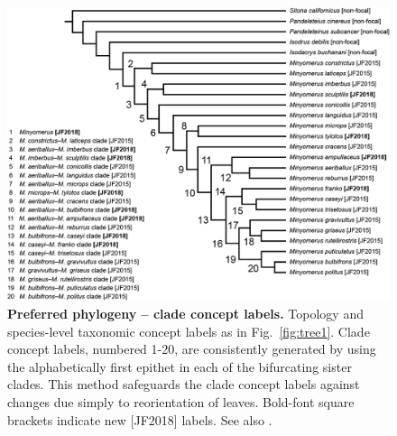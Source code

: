 \documentclass[fleqn,10pt,lineno]{wlpeerj} %
\begin{document}
\begin{figure}[h]
	\centering
	\begin{sideways}
		\includegraphics[height=0.85\textwidth]{figure31.png}
	\end{sideways}
	\caption{\textbf{Preferred phylogeny -- clade concept labels.} Topology and species-level taxonomic concept labels as in Fig.~\ref{fig:tree1}. Clade concept labels, numbered 1-20, are consistently generated by using the alphabetically first epithet in each of the bifurcating sister clades. This method safeguards the clade concept labels against changes due simply to reorientation of leaves. Bold-font square brackets indicate new [JF2018] labels. See also \textbf{}.}
	\label{fig:tree2}
\end{figure}
\end{document}

